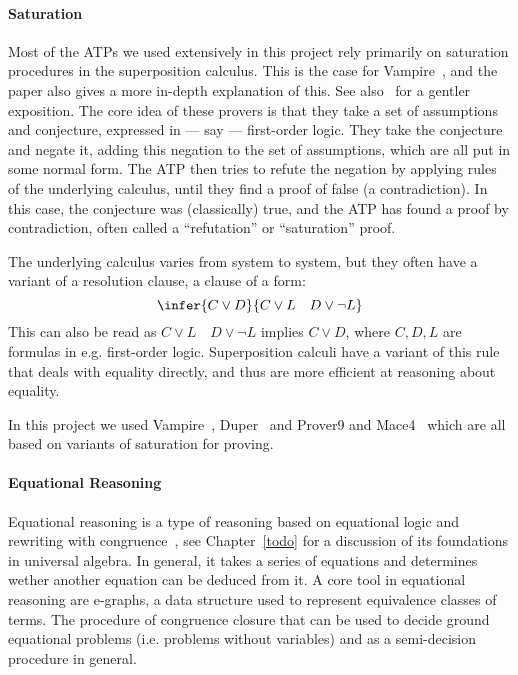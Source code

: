 \paragraph{Saturation}
Most of the ATPs we used extensively in this project rely primarily on saturation procedures in the superposition calculus.
This is the case for Vampire~\cite{DBLP:conf/cav/KovacsV13}, and the paper also gives a more in-depth explanation of this.
See also~\cite{DBLP:journals/cacm/BentkampBNTVW23} for a gentler exposition.
The core idea of these provers is that they take a set of assumptions and conjecture, expressed in --- say --- first-order logic.
They take the conjecture and negate it, adding this negation to the set of assumptions, which are all put in some normal form.
The ATP then tries to refute the negation by applying rules of the underlying calculus, until they find a proof of false (a contradiction).
In this case, the conjecture was (classically) true, and the ATP has found a proof by contradiction, often called a ``refutation'' or ``saturation'' proof.

The underlying calculus varies from system to system, but they often have a variant of a resolution clause, a clause of a form:
\[\infer{C \lor D}{C \lor L \quad D \lor \neg L} \]
This can also be read as $C \lor L \quad D \lor \neg L$ implies $C \lor D$, where $C, D, L$ are formulas in e.g. first-order logic.
Superposition calculi have a variant of this rule that deals with equality directly, and thus are more efficient at reasoning about equality.

In this project we used Vampire~\cite{DBLP:conf/cav/KovacsV13}, Duper~\cite{DBLP:conf/itp/CluneQBA24} and Prover9 and Mace4~\cite{prover9-mace4} which are all based on variants of saturation for proving.

\paragraph{Equational Reasoning}

Equational reasoning is a type of reasoning based on equational logic and rewriting with congruence~\cite{term-rewriting}, see Chapter~\ref{todo} for a discussion of its foundations in universal algebra.
In general, it takes a series of equations and determines wether another equation can be deduced from it.
A core tool in equational reasoning are e-graphs, a data structure used to represent equivalence classes of terms.
The procedure of congruence closure that can be used to decide ground equational problems (i.e. problems without variables) and as a semi-decision procedure in general.

